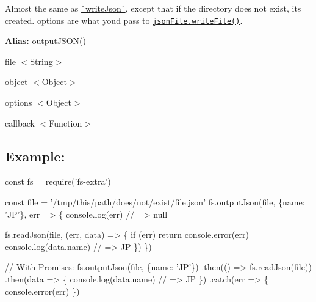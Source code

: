 Almost the same as \mbox{\hyperlink{write_json_8md}{\`{}write\+Json\`{}}}, except that if the directory does not exist, it\textquotesingle{}s created. {\ttfamily options} are what you\textquotesingle{}d pass to \href{https://github.com/jprichardson/node-jsonfile#writefilefilename-options-callback}{\tt {\ttfamily json\+File.\+write\+File()}}.

{\bfseries Alias\+:} {\ttfamily output\+J\+S\+O\+N()}


\begin{DoxyItemize}
\item {\ttfamily file} {\ttfamily $<$String$>$}
\item {\ttfamily object} {\ttfamily $<$Object$>$}
\item {\ttfamily options} {\ttfamily $<$Object$>$}
\item {\ttfamily callback} {\ttfamily $<$Function$>$}
\end{DoxyItemize}

\subsection*{Example\+:}


\begin{DoxyCode}
const fs = require('fs-extra')

const file = '/tmp/this/path/does/not/exist/file.json'
fs.outputJson(file, \{name: 'JP'\}, err => \{
  console.log(err) // => null

  fs.readJson(file, (err, data) => \{
    if (err) return console.error(err)
    console.log(data.name) // => JP
  \})
\})

// With Promises:
fs.outputJson(file, \{name: 'JP'\})
.then(() => fs.readJson(file))
.then(data => \{
  console.log(data.name) // => JP
\})
.catch(err => \{
  console.error(err)
\})
\end{DoxyCode}
 